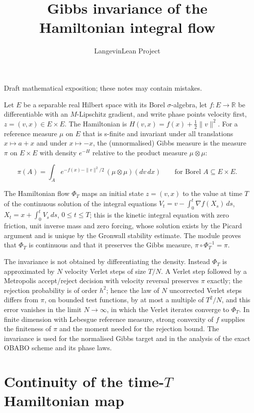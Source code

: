 \documentclass[11pt,a4paper]{article}
\title{\texorpdfstring{Gibbs invariance of the Hamiltonian integral flow}{Gibbs invariance of the Hamiltonian integral flow}}
\author{LangevinLean Project}
\date{}
\begin{document}
\maketitle
Draft mathematical exposition; these notes may contain mistakes.


Let \(E\) be a separable real Hilbert space with its Borel \(\sigma\)-algebra, let \(f:E\to\mathbb R\) be differentiable with an \(M\)-Lipschitz gradient, and write phase points velocity first, \(z=(v,x)\in E\times E\). The Hamiltonian is \(H(v,x)=f(x)+\tfrac12\|v\|^2\). For a reference measure \(\mu\) on \(E\) that is s-finite and invariant under all translations \(x\mapsto a+x\) and under \(x\mapsto-x\), the (unnormalised) Gibbs measure is the measure \(\pi\) on \(E\times E\) with density \(e^{-H}\) relative to the product measure \(\mu\otimes\mu\):


\[\pi(A)=\int_A e^{-f(x)-\|v\|^2/2}\,(\mu\otimes\mu)(dv\,dx)\qquad\text{for Borel }A\subseteq E\times E.\]


The Hamiltonian flow \(\Phi_T\) maps an initial state \(z=(v,x)\) to the value at time \(T\) of the continuous solution of the integral equations \(V_t=v-\int_0^t\nabla f(X_s)\,ds\), \(X_t=x+\int_0^tV_s\,ds\), \(0\le t\le T\); this is the kinetic integral equation with zero friction, unit inverse mass and zero forcing, whose solution exists by the Picard argument and is unique by the Gronwall stability estimate. The module proves that \(\Phi_T\) is continuous and that it preserves the Gibbs measure, \(\pi\circ\Phi_T^{-1}=\pi\).




The invariance is not obtained by differentiating the density. Instead \(\Phi_T\) is approximated by \(N\) velocity Verlet steps of size \(T/N\). A Verlet step followed by a Metropolis accept/\allowbreak{}reject decision with velocity reversal preserves \(\pi\) exactly; the rejection probability is of order \(h^2\); hence the law of \(N\) uncorrected Verlet steps differs from \(\pi\), on bounded test functions, by at most a multiple of \(T^2/N\), and this error vanishes in the limit \(N\to\infty\), in which the Verlet iterates converge to \(\Phi_T\). In finite dimension with Lebesgue reference measure, strong convexity of \(f\) supplies the finiteness of \(\pi\) and the moment needed for the rejection bound. The invariance is used for the normalised Gibbs target and in the analysis of the exact OBABO scheme and its phase laws.


\section{\texorpdfstring{Continuity of the time-\(T\) Hamiltonian map}{Continuity of the time-T Hamiltonian map}}
\end{document}
